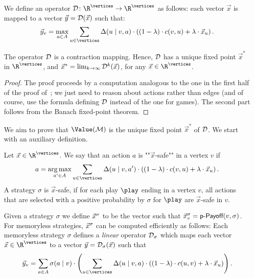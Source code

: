 We define an operator $\discOP\colon 
\R^{\vertices}\rightarrow \R^{\vertices}$ as follows: each vector 
$\vec{x}$%
is mapped to a vector 
$\vec{y}
= \mathcal{D}(\vec{x})$ such that:
$$
\vec{y}_v = \max_{a \in \actions} \sum_{u\in \vertices} \probTranFunc(u\mid 
v,a) 
\cdot\left((1-\lambda)\cdot\colouring(v,u) + \lambda\cdot \vec{x}_u \right).
$$

\begin{lemma}
\label{5-lem:fixpoint}
The operator $\mathcal{D}$ is a contraction mapping. Hence, $\mathcal{D}$ has a unique 
fixed point $\vec{x}^*$ in $\R^{\vertices}$, and $\vec{x}^* = 
\lim_{k\rightarrow \infty} \mathcal{D}^k(\vec{x})$, for any 
$\vec{x}\in\R^{\vertices}$.
\end{lemma}
\begin{proof}
The proof proceeds by a computation analogous to the one in the first half of 
the proof of~; we just need to reason about actions 
rather than edges (and of course, use the formula defining $\mathcal{D}$ instead of 
the one for games). The second part follows from the Banach fixed-point theorem.
\end{proof}

We aim to prove that $\Value(\mdp)$ is the unique fixed point $\vec{x}^*$ of 
$\mathcal{D}$. We start with an auxiliary definition.

\begin{definition}
\label{5-def:disc-safe-act}
Let $\vec{x}\in \R^{\vertices}$. We say that an action $a$ is ""$\vec{x}$-safe"" in 
a vertex $v$ if
\begin{equation}
\label{5-eq:disc-safe-act}
a= \underset{a' \in \actions}{\arg\max} \sum_{u\in \vertices} 
\probTranFunc(u\mid 
v,a') 
\cdot\left((1-\lambda)\cdot\colouring(v,u) + \lambda\cdot \vec{x}_u \right).
\end{equation}
\noindent
A strategy $\sigma$ is $\vec{x}$-safe, if for 
each play $ \play $ ending in a vertex $v$, all actions that are selected with a positive 
probability by $\sigma$ for $\play$ are $\vec{x}$-safe in $v$.
\end{definition}


Given a strategy $\sigma$ we define $\vec{x}^{\sigma}$ to be the vector such that $\vec{x}_{v}^\sigma = 
\textsf{p-Payoff}(v,\sigma)$. For memoryless strategies, $\vec{x}^{\sigma}$ can be computed efficiently as follows:
Each memoryless strategy $\sigma$ defines a \emph{linear} operator $\mathcal{D}_{\sigma}$ which maps each vector 
$\vec{x}\in \R^{\vertices}$ to a vector $\vec{y}=\mathcal{D}_{\sigma}(\vec{x})$ 
such that $$\vec{y}_v = \sum_{a\in \actions} \sigma(a\mid v) \cdot 
\left(\sum_{u \in \vertices} 
\probTranFunc(u \mid v,a) \cdot( (1-\lambda)\cdot \colouring(u,v) + 
\lambda \cdot \vec{x}_u )\right).$$  

